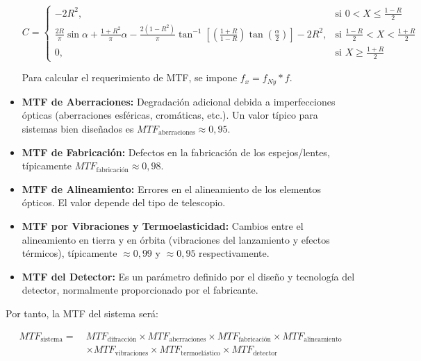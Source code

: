 \begin{itemize}
\begin{equation}
C =
\begin{cases}
-2R^2, & \text{si } 0 < X \leq \frac{1 - R}{2} \\
\frac{2R}{\pi} \sin\alpha + \frac{1 + R^2}{\pi} \alpha - \frac{2(1 - R^2)}{\pi} \tan^{-1}\left[\left(\frac{1 + R}{1 - R}\right)\tan\left(\frac{\alpha}{2}\right)\right] - 2R^2, & \text{si } \frac{1 - R}{2} < X < \frac{1 + R}{2} \\
0, & \text{si } X \geq \frac{1 + R}{2}
\end{cases}
\end{equation}

Para calcular el requerimiento de MTF, se impone $f_x=f_{Ny}*f$. 
  \item \textbf{MTF de Aberraciones:} Degradación adicional debida a imperfecciones ópticas (aberraciones esféricas, cromáticas, etc.). Un valor típico para sistemas bien diseñados es $MTF_{\text{aberraciones}} \approx 0{,}95$.

  \item \textbf{MTF de Fabricación:} Defectos en la fabricación de los espejos/lentes, típicamente $MTF_{\text{fabricación}} \approx 0{,}98$.

  \item \textbf{MTF de Alineamiento:} Errores en el alineamiento de los elementos ópticos. El valor depende del tipo de telescopio.

  \item \textbf{MTF por Vibraciones y Termoelasticidad:} Cambios entre el alineamiento en tierra y en órbita (vibraciones del lanzamiento y efectos térmicos), típicamente $\approx 0{,}99$ y $\approx 0{,}95$ respectivamente.

  \item \textbf{MTF del Detector:} Es un parámetro definido por el diseño y tecnología del detector, normalmente proporcionado por el fabricante.
  
\end{itemize}
Por tanto, la MTF del sistema será:

\begin{align}
MTF_{\text{sistema}} =\ & MTF_{\text{difracción}} \times MTF_{\text{aberraciones}} \times MTF_{\text{fabricación}} \times MTF_{\text{alineamiento}} \nonumber \\
& \times MTF_{\text{vibraciones}} \times MTF_{\text{termoelástico}} \times MTF_{\text{detector}}
\end{align}


